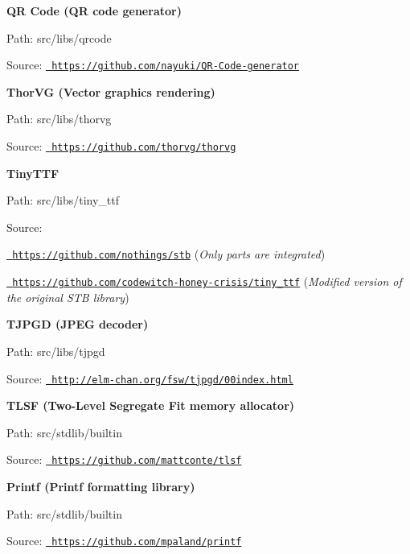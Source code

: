 {\bfseries{QR Code (QR code generator)}}
\begin{DoxyItemize}
\item Path\+: src/libs/qrcode
\item Source\+: \href{https://github.com/nayuki/QR-Code-generator}{\texttt{ https\+://github.\+com/nayuki/\+QR-\/\+Code-\/generator}}
\end{DoxyItemize}

{\bfseries{Thor\+VG (Vector graphics rendering)}}
\begin{DoxyItemize}
\item Path\+: src/libs/thorvg
\item Source\+: \href{https://github.com/thorvg/thorvg}{\texttt{ https\+://github.\+com/thorvg/thorvg}}
\end{DoxyItemize}

{\bfseries{Tiny\+TTF}}
\begin{DoxyItemize}
\item Path\+: src/libs/tiny\+\_\+ttf
\item Source\+:
\begin{DoxyItemize}
\item \href{https://github.com/nothings/stb}{\texttt{ https\+://github.\+com/nothings/stb}} ({\itshape Only parts are integrated})
\item \href{https://github.com/codewitch-honey-crisis/tiny_ttf}{\texttt{ https\+://github.\+com/codewitch-\/honey-\/crisis/tiny\+\_\+ttf}} ({\itshape Modified version of the original STB library})
\end{DoxyItemize}
\end{DoxyItemize}

{\bfseries{TJPGD (JPEG decoder)}}
\begin{DoxyItemize}
\item Path\+: src/libs/tjpgd
\item Source\+: \href{http://elm-chan.org/fsw/tjpgd/00index.html}{\texttt{ http\+://elm-\/chan.\+org/fsw/tjpgd/00index.\+html}}
\end{DoxyItemize}

{\bfseries{TLSF (Two-\/\+Level Segregate Fit memory allocator)}}
\begin{DoxyItemize}
\item Path\+: src/stdlib/builtin
\item Source\+: \href{https://github.com/mattconte/tlsf}{\texttt{ https\+://github.\+com/mattconte/tlsf}}
\end{DoxyItemize}

{\bfseries{Printf (Printf formatting library)}}
\begin{DoxyItemize}
\item Path\+: src/stdlib/builtin
\item Source\+: \href{https://github.com/mpaland/printf}{\texttt{ https\+://github.\+com/mpaland/printf}}
\end{DoxyItemize}

